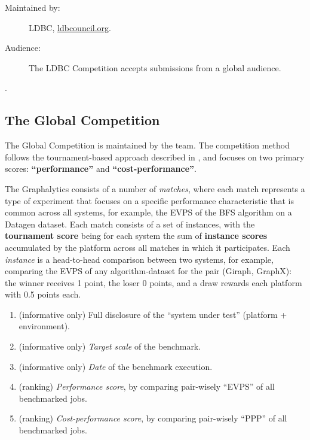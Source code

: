 \begin{description}
    \item[Maintained by:] LDBC, \url{ldbcouncil.org}.
    \item[Audience:] The LDBC Competition accepts submissions from a global audience.
\end{description} 

 .



\subsection{The Global \toolname{} Competition} \label{sec:competitions:graphalytics}
The Global \toolname{} Competition is maintained by the \toolname team. The competition method follows the tournament-based approach described in , and focuses on two primary scores: {\bf ``performance''} and {\bf ``cost-performance''}.

The Graphalytics consists of a number of {\it matches}, where each match represents a type of experiment that focuses on a specific performance characteristic that is common across all systems, for example, the EVPS of the BFS algorithm on a Datagen dataset. Each match consists of a set of instances, with the {\bf tournament score} being for each system the sum of {\bf instance scores} accumulated by the platform across all matches in which it participates.  Each {\it instance} is a head-to-head comparison between two systems, for example, comparing the EVPS of any algorithm-dataset for the pair (Giraph, GraphX): the winner receives 1 point, the loser 0 points, and a draw rewards each platform with 0.5 points each.


\begin{enumerate}
    \item (informative only) Full disclosure of the ``system under test'' (platform + environment).
    \item (informative only) {\it Target scale} of the benchmark.
    \item (informative only) {\it Date} of the benchmark execution.
	\item (ranking) {\it Performance score}, by comparing pair-wisely ``EVPS'' of all benchmarked jobs.
	\item (ranking) {\it Cost-performance score}, by comparing pair-wisely  ``PPP'' of all benchmarked jobs.
\end{enumerate}


